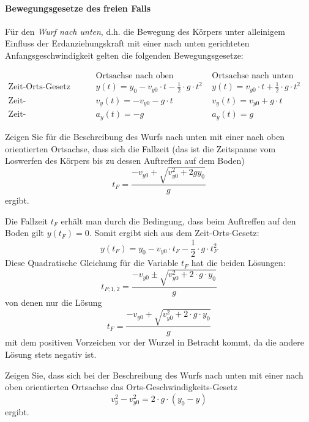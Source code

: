\paragraph{Bewegungsgesetze des freien Falls}
Für den \textit{Wurf nach unten}, d.h. die Bewegung des Körpers unter alleinigem Einfluss der Erdanziehungskraft mit einer nach unten gerichteten Anfangsgeschwindigkeit gelten die folgenden Bewegungsgesetze:
\begin{fullwidth}
\begin{eqnarray*}
    & \text{Ortsachse nach oben orientiert} & \text{Ortsachse nach unten orientiert} \\
    \text{Zeit-Orts-Gesetz} & y(t) = y_{0} - v_{y0} \cdot t - \frac{1}{2} \cdot g \cdot t^{2} & y(t) =v_{y0} \cdot t + \frac{1}{2} \cdot g \cdot t^{2} \\
    \text{Zeit-Geschwindigkeits-Gesetz} & v_{y}(t) = -v_{y0} -g \cdot t & v_{y}(t) = v_{y0} + g \cdot t \\
    \text{Zeit-Beschleunigungs-Gesetz} & a_{y}(t) = -g & a_{y}(t)=g 
\end{eqnarray*}
\end{fullwidth}

\begin{example}
Zeigen Sie für die Beschreibung des Wurfs nach unten mit einer nach oben orientierten Ortsachse, dass sich die Fallzeit (das ist die Zeitspanne vom Loswerfen des Körpers bis zu dessen Auftreffen auf dem Boden)
\[ t_{F} = \frac{-v_{y0} + \sqrt{v_{y0}^{2} + 2 g y_{0}}}{g} \]
ergibt.
\end{example}

\begin{solution}
Die Fallzeit $t_{F}$ erhält man durch die Bedingung, dass beim Auftreffen auf den Boden gilt $y(t_{F})=0$. Somit ergibt sich aus dem Zeit-Orts-Gesetz:
\[ y(t_{F}) = y_{0} - v_{y0} \cdot t_{F} - \frac{1}{2} \cdot g \cdot t_{F}^{2} \]
Diese Quadratische Gleichung für die Variable $t_{F}$ hat die beiden Lösungen:
\[ t_{F;1,2} = \frac{-v_{y0} \pm \sqrt{v_{y0}^{2} + 2 \cdot g \cdot y_{0}}}{g} \]
von denen nur die Lösung
\[ t_{F} = \frac{-v_{y0} + \sqrt{v_{y0}^{2} + 2 \cdot g \cdot y_{0}}}{g} \]
mit dem positiven Vorzeichen vor der Wurzel in Betracht kommt, da die andere Lösung stets negativ ist.
\end{solution}

\begin{example}
Zeigen Sie, dass sich bei der Beschreibung des Wurfs nach unten mit einer nach oben orientierten Ortsachse das Orts-Geschwindigkeits-Gesetz
\[ v_{y}^{2} - v_{y0}^{2} = 2 \cdot g \cdot (y_{0} - y) \]
ergibt.
\end{example}


